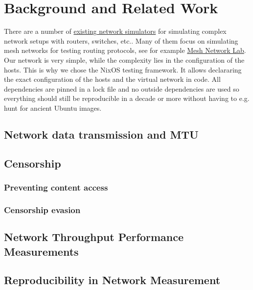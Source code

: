 
\chapter{Background and Related Work}


There are a number of \href{https://brianlinkletter.com/2023/02/network-emulators-and-network-simulators-2023/}{existing network simulators} for simulating complex network setups with routers, switches, etc..
Many of them focus on simulating mesh networks for testing routing protocols, see for example \href{https://github.com/mwarning/meshnet-lab}{Mesh Network Lab}.
Our network is very simple, while the complexity lies in the configuration of the hosts.
This is why we chose the NixOS testing framework.
It allows declararing the exact configuration of the hosts and the virtual network in code.
All dependencies are pinned in a lock file and no outside dependencies are used so everything should still be reproducible in a decade or more without having to e.g. hunt for ancient Ubuntu images.

\section{Network data transmission and MTU}

\section{Censorship}
\subsection{Preventing content access}
\subsection{Censorship evasion}

\section{Network Throughput Performance Measurements}

\section{Reproducibility in Network Measurement}

